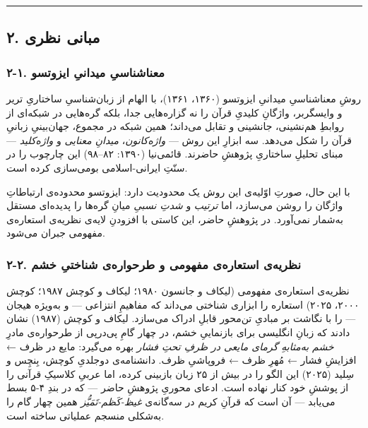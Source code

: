 \documentclass[12pt,a4paper]{article}
\begin{document}
\begin{RTL}
\begin{otherlanguage}{persian}
\begin{center}\rule{0.5\linewidth}{0.5pt}\end{center}

\subsection{۲. مبانی
نظری}\label{ux645ux628ux627ux646ux6cc-ux646ux638ux631ux6cc}

\subsubsection{۲-۱. معناشناسیِ میدانیِ
ایزوتسو}\label{ux645ux639ux646ux627ux634ux646ux627ux633ux6cc-ux645ux6ccux62fux627ux646ux6cc-ux627ux6ccux632ux648ux62aux633ux648}

روشِ معناشناسیِ میدانیِ ایزوتسو (۱۳۶۰، ۱۳۶۱)، با الهام از زبان‌شناسیِ ساختاریِ
تریر و وایسگربر، واژگانِ کلیدیِ قرآن را نه گزاره‌هایی جدا، بلکه گره‌هایی در
شبکه‌ای از روابطِ هم‌نشینی، جانشینی و تقابل می‌داند؛ همین شبکه در مجموع،
جهان‌بینیِ زبانیِ قرآن را شکل می‌دهد. سه ابزارِ این روش --- \emph{واژه‌کانون}،
\emph{میدانِ معنایی} و \emph{واژه‌کلید} --- مبنای تحلیلِ ساختاریِ پژوهشِ
حاضرند. قائمی‌نیا (۱۳۹۰: ۸۲--۹۸) این چارچوب را در سنّتِ ایرانی-اسلامی
بومی‌سازی کرده است.

با این حال، صورتِ اوّلیه‌ی این روش یک محدودیت دارد: ایزوتسو محدوده‌ی
ارتباطاتِ واژگان را روشن می‌سازد، اما \emph{ترتیب} و \emph{شدتِ نسبیِ} میانِ
گره‌ها را پدیده‌ای مستقل به‌شمار نمی‌آورد. در پژوهشِ حاضر، این کاستی با
افزودنِ لایه‌ی نظریه‌ی استعاره‌ی مفهومی جبران می‌شود.

\subsubsection{۲-۲. نظریه‌ی استعاره‌ی مفهومی و طرحواره‌ی شناختیِ
خشم}\label{ux646ux638ux631ux6ccux647ux6cc-ux627ux633ux62aux639ux627ux631ux647ux6cc-ux645ux641ux647ux648ux645ux6cc-ux648-ux637ux631ux62dux648ux627ux631ux647ux6cc-ux634ux646ux627ux62eux62aux6cc-ux62eux634ux645}

نظریه‌ی استعاره‌ی مفهومی (لیکاف و جانسون ۱۹۸۰؛ لیکاف و کوچش ۱۹۸۷؛ کوچش
۲۰۰۰، ۲۰۲۵) استعاره را ابزاری شناختی می‌داند که مفاهیمِ انتزاعی --- و
به‌ویژه هیجان --- را با نگاشت بر مبادیِ تن‌محور قابلِ ادراک می‌سازد. لیکاف و
کوچش (۱۹۸۷) نشان دادند که زبانِ انگلیسی برای بازنماییِ خشم، در چهار گامِ
پی‌درپی از طرحواره‌ی مادرِ \emph{خشم به‌مثابهِ گرمای مایعی در ظرفِ تحتِ فشار}
بهره می‌گیرد: مایع در ظرف ← افزایشِ فشار ← مُهرِ ظرف ← فروپاشیِ ظرف.
دانشنامه‌ی دوجلدیِ کوچش، بِنچِس و سِلید (۲۰۲۵) این الگو را در بیش از ۲۵ زبان
بازبینی کرده، اما عربیِ کلاسیکِ قرآنی را از پوششِ خود کنار نهاده است. ادعای
محوریِ پژوهشِ حاضر --- که در بندِ ۴-۵ بسط می‌یابد --- آن است که قرآنِ کریم در
سه‌گانه‌ی \emph{غیظ-کَظم-تَمَیُّز} همین چهار گام را به‌شکلی منسجم عملیاتی ساخته
است.


\end{otherlanguage}
\end{RTL}
\end{document}
